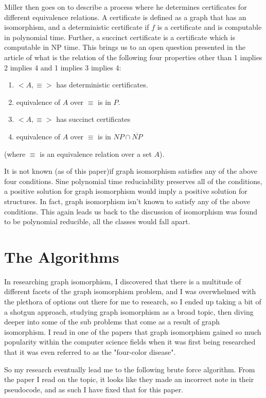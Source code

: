 \documentclass[notitlepage]{report}
\begin{document}
Miller then goes on to describe a process  where he determines certificates for different equivalence relations. A certificate is defined as a graph that has an isomorphism, and a deterministic certificate if $f$ is a certificate and is computable in polynomial time. Further, a succinct certificate is a certificate which is computable in NP time. This brings us to an open question presented in the article of what is the relation of the following four properties other than 1 implies 2 implies 4 and 1 implies 3 implies 4:

\begin{enumerate}
\item $<A,\equiv>$ has deterministic certificates.
\item equivalence of $A$ over $\equiv$ is in $P$.
\item $<A,\equiv>$ has succinct certificates
\item equivalence of $A$ over $\equiv$ is in $NP \cap \overline{NP}$
\end{enumerate}
(where $\equiv$ is an equivalence relation over a set $A$).

It is not known (as of this paper)if graph isomorphism satisfies any of the above four conditions. Sine polynomial time reduciability preserves all of the conditions, a positive solution for graph isomorphism would imply a positive solution for structures. In fact, graph isomorphism isn't known to satisfy any of the above conditions. This again leads us back to the discussion of isomorphism was found to be polynomial reducible, all the classes would fall apart.~\cite{miller}

\section*{The Algorithms}
In researching graph isomorphism, I discovered that there is a multitude of different facets of the graph isomorphism problem, and I was overwhelmed with the plethora of options out there for me to research, so I ended up taking a bit of a shotgun approach, studying graph isomorphism as a broad topic, then diving deeper into some of the sub problems that come as a result of graph isomorphism. I read in one of the papers that graph isomorphism gained so much popularity within the computer science fields when it was first being researched that it was even referred to as the "four-color disease".~\cite{read}

So my research eventually lead me to the following brute force algorithm. From the paper I read on the topic, it looks like they made an incorrect note in their pseudocode, and as such I have fixed that for this paper.
\end{document}
